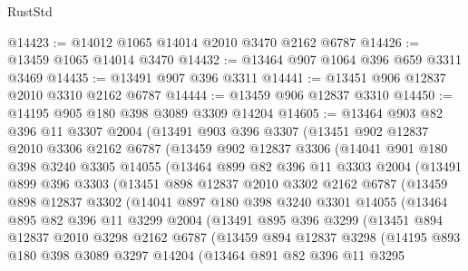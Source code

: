 \begin{lexlean}{RustStd}
\begin{coremodule}
{\begin{coremodule}
{{{{{{{{{{{{{{{{{{{{{{{{{{{{{{{@14423 := @14012 @1065 @14014 @2010 @3470 @2162 @6787
@14426 := @13459 @1065 @14014 @3470
@14432 := @13464 @907 @1064 @396 @659 @3311 @3469
@14435 := @13491 @907 @396 @3311
@14441 := @13451 @906 @12837 @2010 @3310 @2162 @6787
@14444 := @13459 @906 @12837 @3310
@14450 := @14195 @905 @180 @398 @3089 @3309 @14204
@14605 := @13464
    @903
    @82
    @396
    @11
    @3307
    @2004
    (@13491
      @903
      @396
      @3307
      (@13451
        @902
        @12837
        @2010
        @3306
        @2162
        @6787
        (@13459
          @902
          @12837
          @3306
          (@14041
            @901
            @180
            @398
            @3240
            @3305
            @14055
            (@13464
              @899
              @82
              @396
              @11
              @3303
              @2004
              (@13491
                @899
                @396
                @3303
                (@13451
                  @898
                  @12837
                  @2010
                  @3302
                  @2162
                  @6787
                  (@13459
                    @898
                    @12837
                    @3302
                    (@14041
                      @897
                      @180
                      @398
                      @3240
                      @3301
                      @14055
                      (@13464
                        @895
                        @82
                        @396
                        @11
                        @3299
                        @2004
                        (@13491
                          @895
                          @396
                          @3299
                          (@13451
                            @894
                            @12837
                            @2010
                            @3298
                            @2162
                            @6787
                            (@13459
                              @894
                              @12837
                              @3298
                              (@14195
                                @893
                                @180
                                @398
                                @3089
                                @3297
                                @14204
                                (@13464
                                  @891
                                  @82
                                  @396
                                  @11
                                  @3295
}}}}}}}}}}}}}}}}}}}}}}}}}}}}}}}
\end{coremodule}}
\end{coremodule}
\end{lexlean}
